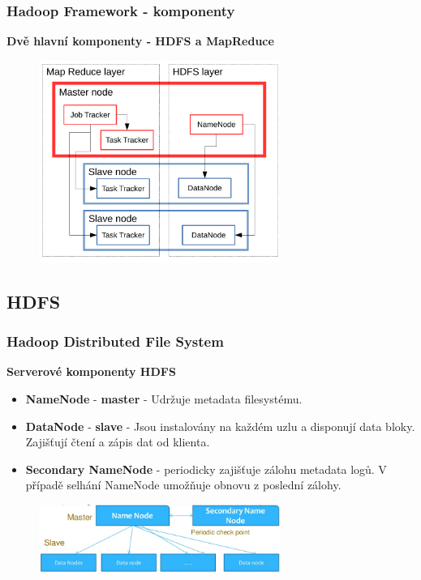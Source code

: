 \documentclass[unicode,bookmarksnumbered]{beamer}
\begin{document}
	\begin{frame}
		\frametitle{Hadoop Framework - komponenty}
		\textbf{Dvě hlavní komponenty - HDFS a MapReduce}
		\begin{figure}
			\centering
			\includegraphics[width=0.7\textwidth]{./img/hadoop/schema2.pdf}
		\end{figure}
	\end{frame}
	\subsection{HDFS} 
	\begin{frame}
		\frametitle{Hadoop Distributed File System}  
			\textbf{Serverové komponenty HDFS}
			\begin{itemize}
				\item \textbf{NameNode} - \textbf{master} - Udržuje metadata filesystému.
				\item \textbf{DataNode} - \textbf{slave} -  Jsou instalovány na každém uzlu
a disponují data bloky. Zajišťují čtení a zápis dat od klienta.
				\item \textbf{Secondary NameNode} - periodicky zajišťuje zálohu metadata
logů. V případě selhání NameNode umožňuje obnovu z poslední zálohy.
			\end{itemize}
		\begin{figure}
			\centering
			\includegraphics[width=0.7\textwidth]{./img/hadoop/ms.png}
		\end{figure}
	\end{frame}
%
\end{document}
